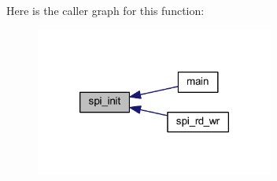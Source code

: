Here is the caller graph for this function\-:\nopagebreak
\begin{figure}[H]
\begin{center}
\leavevmode
\includegraphics[width=222pt]{dd/dad/a00005_ga96ddfd5c89b80852982ba50dd18256f6_icgraph}
\end{center}
\end{figure}


